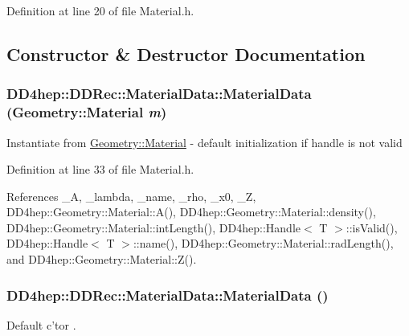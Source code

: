 Definition at line 20 of file Material.h.

\subsection{Constructor \& Destructor Documentation}
\hypertarget{class_d_d4hep_1_1_d_d_rec_1_1_material_data_a13401e43c53f525dc9adc6b497c6f0e6}{
\subsubsection[{MaterialData}]{\setlength{\rightskip}{0pt plus 5cm}DD4hep::DDRec::MaterialData::MaterialData ({\bf Geometry::Material} {\em m})}}
\label{class_d_d4hep_1_1_d_d_rec_1_1_material_data_a13401e43c53f525dc9adc6b497c6f0e6}
Instantiate from \hyperlink{class_d_d4hep_1_1_geometry_1_1_material}{Geometry::Material} -\/ default initialization if handle is not valid 

Definition at line 33 of file Material.h.

References \_\-A, \_\-lambda, \_\-name, \_\-rho, \_\-x0, \_\-Z, DD4hep::Geometry::Material::A(), DD4hep::Geometry::Material::density(), DD4hep::Geometry::Material::intLength(), DD4hep::Handle$<$ T $>$::isValid(), DD4hep::Handle$<$ T $>$::name(), DD4hep::Geometry::Material::radLength(), and DD4hep::Geometry::Material::Z().\hypertarget{class_d_d4hep_1_1_d_d_rec_1_1_material_data_ae227988b42f40660dd9d59e0caecb1ef}{
\subsubsection[{MaterialData}]{\setlength{\rightskip}{0pt plus 5cm}DD4hep::DDRec::MaterialData::MaterialData ()}}
\label{class_d_d4hep_1_1_d_d_rec_1_1_material_data_ae227988b42f40660dd9d59e0caecb1ef}
Default c'tor . 

